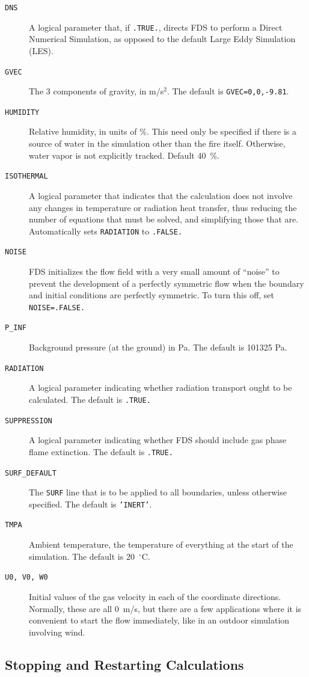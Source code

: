 \documentclass[11pt]{book}
\newcommand{\ct}{\tt\small}
\begin{document}
\begin{description}
\item[{\ct DNS}] A logical parameter that, if {\ct .TRUE.}, directs FDS to perform a Direct Numerical Simulation, as opposed to the default Large Eddy Simulation (LES).
\item[{\ct GVEC}] The 3 components of gravity, in m/s$^2$. The default is {\ct GVEC=0,0,-9.81}.
\item[{\ct HUMIDITY}] Relative humidity, in units of \%. This need only be specified if there is a source of water in the simulation other than the fire
itself. Otherwise, water vapor is not explicitly tracked. Default 40~\%.
\item[{\ct ISOTHERMAL}] A logical parameter that indicates that the calculation does not involve any changes in temperature or
radiation heat transfer, thus reducing the number of equations that must be solved, and simplifying those that are. Automatically sets {\ct RADIATION} to
{\ct .FALSE.}
\item[{\ct NOISE}] FDS initializes the flow field with a very small amount of ``noise'' to prevent the development of a perfectly symmetric flow when the boundary
and initial conditions are perfectly symmetric. To turn this off, set {\ct NOISE=.FALSE.}
\item[{\ct P\_INF}] Background pressure (at the ground) in Pa. The default is 101325 Pa.
\item[{\ct RADIATION}] A logical parameter indicating whether radiation transport ought to be calculated. The default is {\ct .TRUE.}
\item[{\ct SUPPRESSION}] A logical parameter indicating whether FDS should include gas phase flame extinction. The default is {\ct .TRUE.}
\item[{\ct SURF\_DEFAULT}] The {\ct SURF} line that is to be applied to all boundaries, unless otherwise specified. The default is {\ct 'INERT'}.
\item[{\ct TMPA}] Ambient temperature, the temperature of everything at the start of the simulation. The default is 20~$^\circ$C.
\item[{\ct U0, V0, W0}] Initial values of the gas velocity in each of the coordinate directions. Normally, these are all 0~m/s, but there are a few applications where it is
convenient to start the flow immediately, like in an outdoor simulation involving wind.
\end{description}

\subsection{Stopping and Restarting Calculations}
\label{info:restart}
\end{document}
